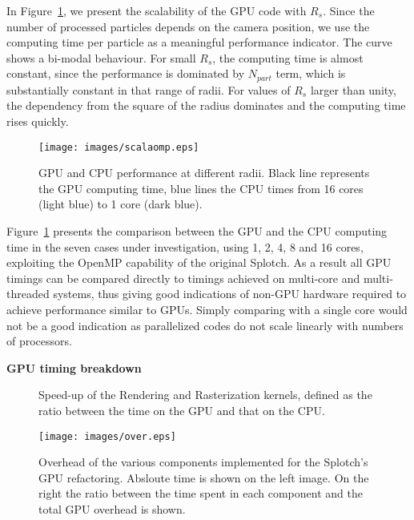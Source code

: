 \documentclass[11pt]{article}
\begin{document}
In Figure~\ref{fig:gpucpu}, we present the scalability of the GPU code 
with $R_s$. Since the number of processed particles depends on
the camera position, we use the  
computing time per particle as a meaningful performance
indicator. The curve shows a bi-modal behaviour. For small $R_s$,
the computing time is almost constant, since the performance is dominated
by $N_{part}$ term, which is substantially constant in that range of 
radii. For values of $R_s$ larger 
than unity, the dependency from the square of the radius dominates and the computing time 
rises quickly. 

\begin{figure}
\centering
\texttt{[image: images/scalaomp.eps]}
\caption{GPU and CPU performance at different radii. Black line represents the GPU 
computing time, blue lines the CPU times from 16 cores (light blue) to 1 core
(dark blue).}
\label{fig:gpucpu}
\end{figure}

Figure~\ref{fig:gpucpu} presents the comparison between the GPU and the CPU computing time
in the seven cases under investigation, using 
1, 2, 4, 8 and 16 cores, exploiting 
the OpenMP \cite{openmpurl} capability of the original Splotch. As a result all GPU timings can be compared directly to
timings achieved on multi-core and multi-threaded systems, thus giving good indications of non-GPU 
hardware required to achieve performance similar to GPUs. Simply comparing with a single core would not 
be a good indication as parallelized codes do not scale linearly with numbers of processors.

\medskip
\noindent
{\bf GPU timing breakdown}

\begin{figure}
\centering
\caption{
Speed-up of the Rendering and Rasterization kernels, defined as the ratio
between the time on the GPU and that on the CPU.
}
\label{fig:speedup}
\end{figure}

\begin{figure}
\centering
\texttt{[image: images/over.eps]}
\caption{Overhead of the various components implemented for the Splotch's
GPU refactoring. Absloute time is shown on the left image. On the right
the ratio between the time spent in each component and the total GPU 
overhead is shown.}
\label{fig:over}
\end{figure}
\end{document}

